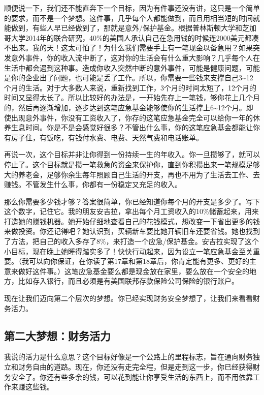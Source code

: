 顺便说一下，我们还不能直奔下一个目标，因为有件事还没有讲，这只是一个简单的要求，而不是一个梦想。这件事，几乎每个人都能做到，而且用相当短的时间就能做到，有些人早已经做到了，那就是意外/保护基金。根据普林斯顿大学和芝加哥大学2014年的联合研究，40\%的美国人承认自己在急用钱的时候连2000美元都凑不出来。我的天！这太可怕了！为什么我们需要手上有一笔现金以备急用？如果突发意外事件，你的收入流中断了，这对你的生活会有什么重大影响？几乎每个人在生活中都会遇到这种事。造成你收入突然中断的意外事件，可能是健康问题，可能是你的企业出了问题，也可能是丢了工作。所以，你需要一些钱来支撑自己3\textasciitilde{}12个月的生活。对于大多数人来说，重新找到工作，3个月的时间太短了，12个月的时间又显得太长了。所以比较好的办法是，一开始先存上一笔钱，够你花上几个月的，然后再逐渐增加，逐步达到这笔应急基金能够使你的生活撑上6\textasciitilde{}12个月。即使出现意外事件，你没有工资收入了，你存的这笔应急基金完全可以给你一年的休养生息时间。你是不是会感觉好很多？不管出什么事，你的这笔应急基金都能让你有房子住，有饭吃，有钱付水费、电费、天然气费和电话账单。

再说一次，这个目标并非让你得到一份持续一生的年收入。你一旦攒够了，就可以停止了。这个目标就是攒一笔救急的资金来保护你，直到你积攒出来一笔规模足够大的养老金，足够你余生每年照顾自己生活的开支，再也不用为了生活去工作、去赚钱。不管发生什么事，你都有一份稳定又充足的收入。

那么你需要多少钱才够？答案很简单，你已经知道你每个月的开支是多少了。写下这个数字，记住它。我的朋友安吉拉，拿出每个月工资收入的10\%储蓄起来，用来打造她的赚钱机器。她开始仔细地查看自己的花钱模式，想改变一下省出更多的钱来做投资。你还记得吧？她认识到，买辆新车要比她开辆旧车还要省钱。她也找到了方法，把自己的收入多存了8\%，来打造一个应急/保护基金。安吉拉实现了这个小目标，现在晚上她睡得踏实多了！快快行动起来，因为设立一笔应急基金至关重要。（我可以向你保证，在你读了第17章和第18章后，你肯定能有更多、更好的主意来做好这件事。）这笔应急基金要么都是现金放在家里，要么放在一个安全的地方，比如存入银行，而且必须是有美国联邦存款保险公司保险的银行账户。

现在让我们迈向第二个层次的梦想。你已经实现财务安全梦想了，让我们来看看财务活力。

\subsection{第二大梦想：财务活力}

我说的活力是什么意思？这个目标好像是一个公路上的里程标志，旨在通向财务独立和财务自由的道路。现在，你还没有走完全程，但是走到这一步，你已经获得财务安全了。你还有些多余的钱，可以花到能让你享受生活的东西上，而不用依靠工作来赚这些钱。

